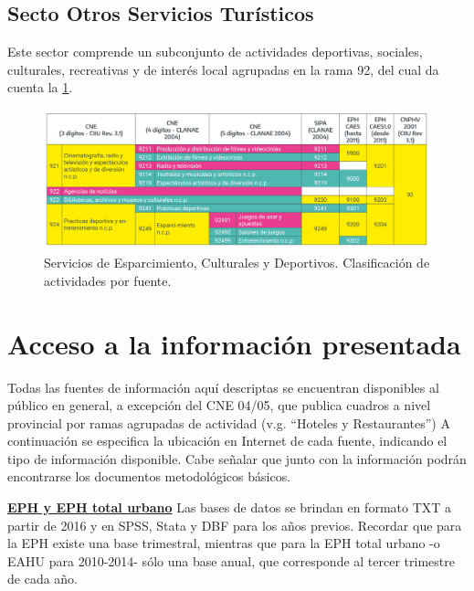 \documentclass[
  openany]{book}
\begin{document}
\hypertarget{secto-otros-servicios-turuxedsticos}{%
\subsection{Secto Otros Servicios Turísticos}\label{secto-otros-servicios-turuxedsticos}}

Este sector comprende un subconjunto de actividades deportivas, sociales, culturales, recreativas y de interés local agrupadas en la rama 92, del cual da cuenta la \ref{fig:empleofuentes11}.

\begin{figure}

{\centering \includegraphics[width=0.8\linewidth]{imagenes/figura3.11} 

}

\caption{ Servicios de Esparcimiento, Culturales y  Deportivos. Clasificación de actividades por fuente.}\label{fig:empleofuentes11}
\end{figure}

\hypertarget{acceso-a-la-informaciuxf3n-presentada}{%
\section{Acceso a la información presentada}\label{acceso-a-la-informaciuxf3n-presentada}}

Todas las fuentes de información aquí descriptas se encuentran disponibles al público en general, a excepción del CNE 04/05, que publica cuadros a nivel provincial por ramas agrupadas de actividad (v.g. ``Hoteles y Restaurantes'')
A continuación se especifica la ubicación en Internet de cada fuente, indicando el tipo de información disponible.
Cabe señalar que junto con la información podrán encontrarse los documentos metodológicos básicos.

\href{https://www.indec.gob.ar/indec/web/Institucional-Indec-BasesDeDatos-1}{\textbf{EPH y EPH total urbano}} Las bases de datos se brindan en formato TXT a partir de 2016 y en SPSS, Stata y DBF para los años previos.
Recordar que para la EPH existe una base trimestral, mientras que para la EPH total urbano -o EAHU para 2010-2014- sólo una base anual, que corresponde al tercer trimestre de cada año.
\end{document}
